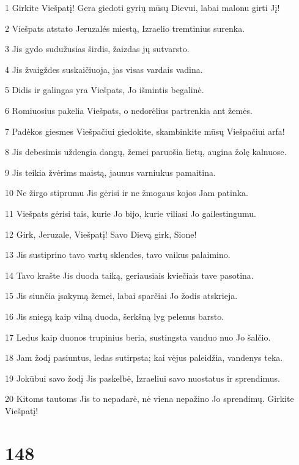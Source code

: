 \par 1 Girkite Viešpatį! Gera giedoti gyrių mūsų Dievui, labai malonu girti Jį! 
\par 2 Viešpats atstato Jeruzalės miestą, Izraelio tremtinius surenka. 
\par 3 Jis gydo sudužusias širdis, žaizdas jų sutvarsto. 
\par 4 Jis žvaigždes suskaičiuoja, jas visas vardais vadina. 
\par 5 Didis ir galingas yra Viešpats, Jo išmintis begalinė. 
\par 6 Romiuosius pakelia Viešpats, o nedorėlius partrenkia ant žemės. 
\par 7 Padėkos giesmes Viešpačiui giedokite, skambinkite mūsų Viešpačiui arfa! 
\par 8 Jis debesimis uždengia dangų, žemei paruošia lietų, augina žolę kalnuose. 
\par 9 Jis teikia žvėrims maistą, jaunus varniukus pamaitina. 
\par 10 Ne žirgo stiprumu Jis gėrisi ir ne žmogaus kojos Jam patinka. 
\par 11 Viešpats gėrisi tais, kurie Jo bijo, kurie viliasi Jo gailestingumu. 
\par 12 Girk, Jeruzale, Viešpatį! Savo Dievą girk, Sione! 
\par 13 Jis sustiprino tavo vartų sklendes, tavo vaikus palaimino. 
\par 14 Tavo krašte Jis duoda taiką, geriausiais kviečiais tave pasotina. 
\par 15 Jis siunčia įsakymą žemei, labai sparčiai Jo žodis atskrieja. 
\par 16 Jis sniegą kaip vilną duoda, šerkšną lyg pelenus barsto. 
\par 17 Ledus kaip duonos trupinius beria, sustingsta vanduo nuo Jo šalčio. 
\par 18 Jam žodį pasiuntus, ledas sutirpsta; kai vėjus paleidžia, vandenys teka. 
\par 19 Jokūbui savo žodį Jis paskelbė, Izraeliui savo nuostatus ir sprendimus. 
\par 20 Kitoms tautoms Jis to nepadarė, nė viena nepažino Jo sprendimų. Girkite Viešpatį!


\chapter{148}


